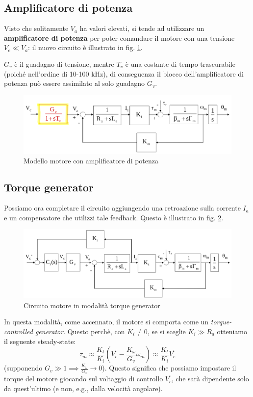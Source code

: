 \subsection{Amplificatore di potenza}
Visto che solitamente $V_a$ ha valori elevati, si tende ad utilizzare un \textbf{amplificatore di potenza} per poter comandare il motore con una tensione $V_c \ll V_a$: il nuovo circuito è illustrato in fig. \ref{fig:electricactuator2}. 

$G_v$ è il guadagno di tensione, mentre $T_v$ è una costante di tempo trascurabile (poiché nell’ordine di 10-100 kHz), di conseguenza il blocco dell’amplificatore di potenza può essere assimilato al solo guadagno $G_v$.


\begin{figure}[th!]
	\centering
	\includegraphics[width=0.7\linewidth]{images/electric_actuator_2}
	\caption{Modello motore con amplificatore di potenza}
	\label{fig:electricactuator2}
\end{figure}



\subsection{Torque generator}\label{section:torque_generator}

Possiamo ora completare il circuito aggiungendo una retroazione sulla corrente $I_a$ e un compensatore che utilizzi tale feedback. Questo è illustrato in fig. \ref{fig:electricactuator3}.

\begin{figure}[th!]
	\centering
	\includegraphics[width=0.7\linewidth]{images/electric_actuator_3}
	\caption{Circuito motore in modalità torque generator}
	\label{fig:electricactuator3}
\end{figure}

In questa modalità, come accennato, il motore si comporta come un \textit{torque-controlled generator}. Questo perchè, con $K_i \neq 0$, se si sceglie $K_i \gg R_a$ otteniamo il seguente steady-state:
$$
\tau_m \approx \frac{K_t}{K_i}(V^{'}_c - \frac{K_\omega}{G_v}\omega_m)
\approx
\frac{K_t}{K_i}V^{'}_c
$$
(supponendo $G_v \gg 1 \implies \frac{K_\omega}{G_v} \to 0$). Questo significa che possiamo impostare il torque del motore giocando sul voltaggio di controllo $V^{'}_c$, che sarà dipendente solo da quest'ultimo (e non, e.g., dalla velocità angolare).





